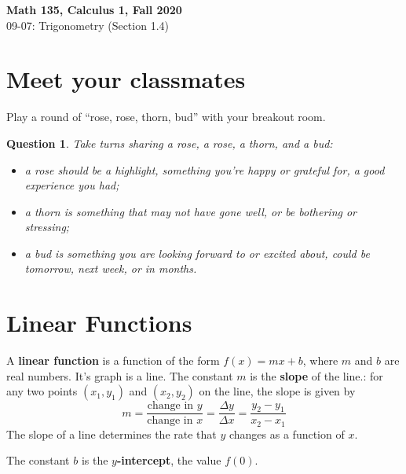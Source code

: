\documentclass[11pt,reqno,final]{amsart}
\numberwithin{equation}{section}
\numberwithin{figure}{section}
\newtheorem{question*}{Question}
\theoremstyle{definition} %
\begin{document}
\begin{center}
        \textbf{\Large Math 135, Calculus 1, Fall 2020}\\[10pt]
        {\large 09-07: Trigonometry (Section 1.4)}
\end{center}

\thispagestyle{empty}

\renewcommand{\thesection}{\Alph{section}}

\section{Meet your classmates}

Play a round of ``rose, rose, thorn, bud'' with your breakout room.
\begin{question*}
        Take turns sharing a rose, a rose, a thorn, and a bud:
        \begin{itemize}[-]
        \item a \textit{rose} should be a highlight, something you're happy or grateful for, a good experience you had;
        \item a \textit{thorn} is something that may not have gone well, or be bothering or stressing;
        \item a \textit{bud} is something you are looking forward to or excited about, could be tomorrow, next week, or in months.
        \end{itemize}
\end{question*}
        
\section{Linear Functions}

\begin{framed}
        A \textbf{linear function} is a function of the form $f(x) = mx + b$, where $m$ and $b$ are real numbers.
        It's graph is a line.
        The constant $m$ is the \textbf{slope} of the line.:
        for any two points $(x_1, y_1)$ and $(x_2, y_2)$ on the line, the slope is given by
        \[
                m = \dfrac{\mbox{change in $y$}}{\mbox{change in $x$}} = \dfrac{\Delta y}{\Delta x} = \dfrac{y_2 - y_1}{x_2 - x_1}
        \]
        The slope of a line determines the rate that $y$ changes as a function of $x$.
        
        The constant $b$ is the \textbf{$y$-intercept}, the value $f(0)$.
\end{framed}
\end{document}
